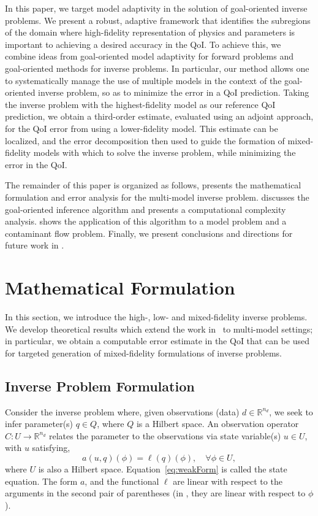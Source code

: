 \documentclass[review,sort&compress]{elsarticle}
\newcommand{\R}{{\mathbb{R}}}
\newcommand{\Reals}{{\mathbb{R}}}
\theoremstyle{plain} %
\theoremstyle{definition} %
\begin{document}
In this paper, we target model adaptivity in the solution of goal-oriented inverse problems. We present a robust, adaptive framework that identifies the subregions of the domain where high-fidelity representation of physics and parameters is important to achieving a desired accuracy in the QoI. To achieve this, we combine ideas from goal-oriented model adaptivity for forward problems and goal-oriented methods for inverse problems. In particular, our method allows one to systematically manage the use of multiple models in the context of the goal-oriented inverse problem, so as to minimize the error in a QoI prediction. Taking the inverse problem with the highest-fidelity model as our reference QoI prediction, we obtain a third-order estimate, evaluated using an adjoint approach, for the QoI error from using a lower-fidelity model. This estimate can be localized, and the error decomposition then used to guide the formation of mixed-fidelity models with which to solve the inverse problem, while minimizing the error in the QoI. 

The remainder of this paper is organized as follows,  presents the mathematical formulation and error analysis for the multi-model inverse problem.  discusses the goal-oriented inference algorithm and presents a computational complexity analysis.  shows the application of this algorithm to a model problem and a contaminant flow problem. Finally, we present conclusions and directions for future work in .


\section{Mathematical Formulation}\label{sec:form}
%
In this section, we introduce the high-, low- and mixed-fidelity inverse problems. We develop theoretical results which extend the work in~\cite{BecVex05} to multi-model settings; in particular, we obtain a computable error estimate in the QoI that can be used for targeted generation of mixed-fidelity formulations of inverse problems.

\subsection{Inverse Problem Formulation}  \label{sec:setup}
%
Consider the inverse problem where, given observations (data) $d\in\R^{n_d}$, we seek to infer parameter(s) $q\in Q$, where $Q$ is a Hilbert space. An observation operator $C:U\to\Reals^{n_d}$ relates the parameter to the observations via state variable(s) $u\in U$, with $u$ satisfying,
%
\begin{equation}
a(u,q)(\phi)=\ell(q)(\phi),\quad\forall\phi\in U,
\label{eq:weakForm}
\end{equation}
%
where $U$ is also a Hilbert space. Equation~\ref{eq:weakForm} is called the state equation. The form $a$, and the functional $\ell$ are linear with respect to the arguments in the second pair of parentheses (in , they are linear with respect to $\phi$).
\end{document}
